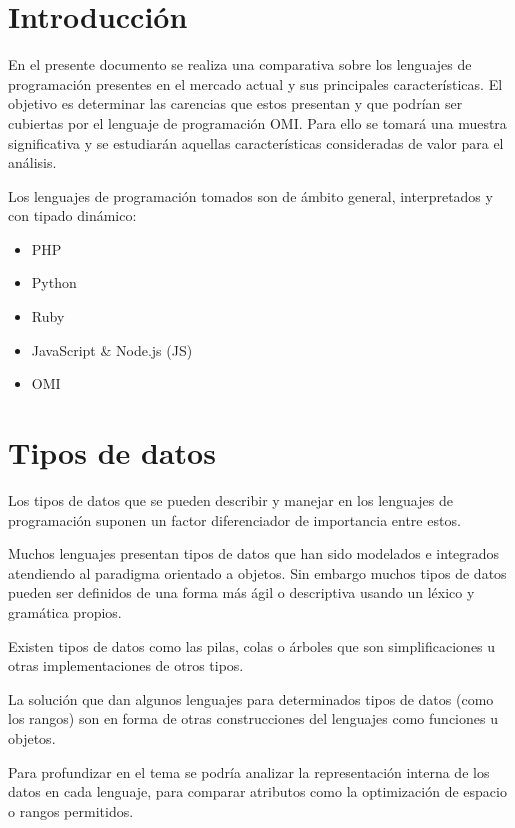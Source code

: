 
\section{Introducción}
En el presente documento se realiza una comparativa sobre los lenguajes de programación presentes en el mercado actual y sus principales 
características. El objetivo es determinar las carencias que estos presentan y que podrían ser cubiertas por el lenguaje de programación OMI.
Para ello se tomará una muestra significativa y se estudiarán aquellas características consideradas de valor para el análisis.

Los lenguajes de programación tomados son de ámbito general, interpretados y con tipado dinámico:

\begin{itemize}
   \item PHP
   \item Python
   \item Ruby
   \item JavaScript \& Node.js (JS)
   \item OMI
\end{itemize}

\section{Tipos de datos}
Los tipos de datos que se pueden describir y manejar en los lenguajes de 
programación suponen un factor diferenciador de importancia entre estos.

Muchos lenguajes presentan tipos de datos que han sido modelados e integrados atendiendo
al paradigma orientado a objetos. Sin embargo muchos tipos de datos pueden ser definidos
de una forma más ágil o descriptiva usando un léxico y gramática propios.   

Existen tipos de datos como las pilas, colas o árboles que son simplificaciones u otras 
implementaciones de otros tipos.

La solución que dan algunos lenguajes para determinados tipos de datos (como los rangos) son en forma 
de otras construcciones del lenguajes como funciones u objetos.

Para profundizar en el tema se podría analizar la representación interna de los
datos en cada lenguaje, para comparar atributos como la optimización de espacio o rangos permitidos. 

